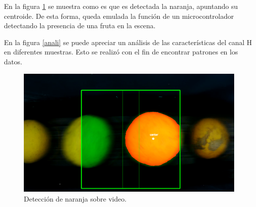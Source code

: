 \documentclass[twoside,spanish,ESP,MSc]{plantillaLabUPV}
\theoremstyle{definition}
\begin{document}
\begin{enumerate}
\begin{enumerate}
	En la figura \ref{framito} se muestra como es que es detectada la naranja, apuntando su centroide. De esta forma, queda emulada la función de un microcontrolador detectando la presencia de una fruta en la escena. 
	
	En la figura \ref{anali} se puede apreciar un análisis de las características del canal H en diferentes muestras. Esto se realizó con el fin de encontrar patrones en los datos.
	
	\begin{figure}[!h]
		\centering
		\includegraphics*[scale=0.30]{framito} 
		\caption{Detección de naranja sobre video.}
		\label{framito}
	\end{figure}
	
	\newcommand{\sis}{0.37}
	

\end{enumerate}
\end{enumerate}
\end{document}
